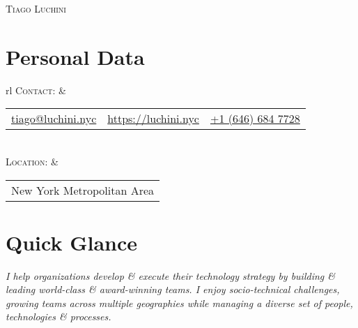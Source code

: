 \documentclass[a4paper,10pt]{article}
\begin{document}
\pagestyle{empty} %

\par{\centering
  {\Huge \textsc{Tiago Luchini}}\bigskip\par}

\section{Personal Data}

\begin{tabular}{rl}
  \textsc{Contact:} & \begin{tabular}{lll}
    \href{mailto:tiago@luchini.nyc}{tiago@luchini.nyc} &
    \href{https://luchini.nyc}{https://luchini.nyc} &
    \href{tel:+16466847728}{+1 (646) 684 7728}
  \end{tabular}\\

  \textsc{Location:} & \begin{tabular}{l}
    New York Metropolitan Area
  \end{tabular}
\end{tabular}

\section{Quick Glance}
\emph{I help organizations develop \& execute their technology
strategy by building \& leading world-class \& award-winning teams. I
enjoy socio-technical challenges, growing teams across multiple
geographies while managing a diverse set of people, technologies \&
processes.}

\end{document}
